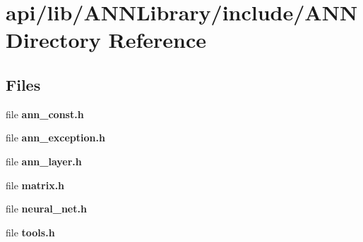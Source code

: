 \section{api/lib/\+A\+N\+N\+Library/include/\+A\+N\+N Directory Reference}
\label{dir_5686e0713db69514459269f1e2246c64}
\subsection*{Files}
\begin{DoxyCompactItemize}
\item 
file {\bfseries ann\+\_\+const.\+h}
\item 
file {\bfseries ann\+\_\+exception.\+h}
\item 
file {\bfseries ann\+\_\+layer.\+h}
\item 
file {\bfseries matrix.\+h}
\item 
file {\bfseries neural\+\_\+net.\+h}
\item 
file {\bfseries tools.\+h}
\end{DoxyCompactItemize}
